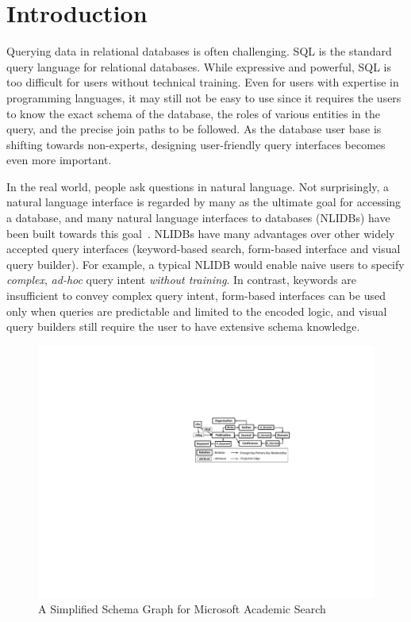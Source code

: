 \documentclass{vldb}
\begin{document}
\section{Introduction}
\label{sec:introduction}

Querying data in relational databases is often challenging.  SQL is the standard query language for relational databases.  While expressive and powerful, SQL is too difficult for users without technical training.  Even for users with expertise in programming languages, it may still not be easy to use since it requires the users to know the exact schema of the database, the roles of various entities in the query, and the precise join paths to be followed.   As the database user base is shifting towards non-experts, designing user-friendly query interfaces becomes even more important.   

In the real world, people ask questions in natural language.  Not surprisingly, a natural language interface is regarded by many as the ultimate goal for accessing a database, and many natural language interfaces to databases (NLIDBs) have been built towards this goal~\cite{DBLP:journals/nle/AndroutsopoulosRT95,DBLP:conf/iui/PopescuEK03,DBLP:journals/tods/LiYJ07,DBLP:conf/vldb/Minock07,DBLP:journals/pvldb/LiJ14,DBLP:conf/acl/DongL16,DBLP:journals/debu/LuLK16,DBLP:journals/cacm/Liang16,DBLP:journals/tacl/ReddyTCKDSL16}.  NLIDBs have many advantages over other widely accepted query interfaces (keyword-based search, form-based interface and visual query builder).  For example, a typical NLIDB would enable naive users to specify \emph{complex}, \emph{ad-hoc} query intent \emph{without training}.  In contrast, keywords are insufficient to convey complex query intent, form-based interfaces can be used only when queries are predictable and limited to the encoded logic, and visual query builders still require the user to have extensive schema knowledge.

\begin{figure}
  \center
  \includegraphics[width=0.95\linewidth]{pic/runningExample.pdf}
  \caption{A Simplified Schema Graph for Microsoft Academic Search}
  \label{fig:runningExample}
\end{figure}
\end{document}
